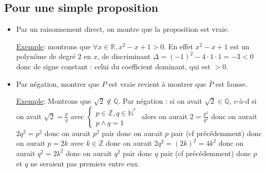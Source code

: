 \documentclass[12pt,a4paper,french]{book}
\begin{document}
\subsection{Pour une simple proposition}
\begin{itemize}
	\item Par un raisonnement direct, on montre que la proposition est vraie.
	
	\underline{Exemple}: montrons que $\forall x \in \mathbb{R}, x^{2}-x+1 > 0$. En effet $x^{2}-x+1$ est un polynôme de degré 2 en $x$, de discriminant $\Delta = (-1)^{2}-4\cdot1\cdot1 = -3 < 0$ donc de signe constant : celui du coefficient dominant, qui est $>0$. 
	\item Par négation, montrer que $P$ est vraie revient à montrer que $\bar{P}$ est fausse.
	
	\underline{Exemple}: Montrons que $\sqrt{2} \notin \mathbb{Q}$. Par négation : si on avait  $\sqrt{2} \in \mathbb{Q}$, c-à-d si on avait $
	\sqrt{2} = \frac{p}{q}$ avec 
	$
	\left\{ 
		\begin{array}{ll}
			p \in \mathbb{Z}, q \in \mathbb{N}^{\ast} \\ 
			p \wedge q = 1 
		\end{array}
	\right. $ 
		alors on aurait $2 = \frac{p^{2}}{q^{2}}$ donc on aurait $2q^{2} = p^{2}$ donc on aurait $p^{2}$ pair donc on aurait $p$ pair (cf précédemment) donc on aurait $p = 2k$ avec $k \in \mathbb{Z}$ donc on aurait $2q^{2} = (2k)^{2} = 4k^{2}$ donc on aurait $q^{2} = 2k^{2}$ donc on aurait $q^{2}$ pair donc $q$ pair (cf précédemment) donc $p$ et $q$ ne seraient pas premiers entre eux.
\end{itemize}
\end{document}
